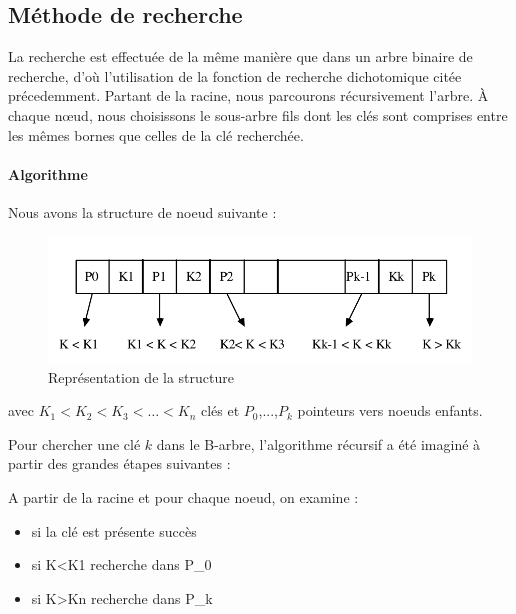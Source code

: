 \subsection{Méthode de recherche}
La recherche est effectuée de la même manière que dans un arbre binaire de recherche, d'où l'utilisation de la fonction de recherche dichotomique citée précedemment. Partant de la racine, nous parcourons récursivement l’arbre. À chaque nœud, nous choisissons le sous-arbre fils dont les clés sont comprises entre les mêmes bornes que celles de la clé recherchée.
\paragraph{Algorithme} Nous avons la structure de noeud suivante :
\begin{figure}[hbt]
	\centering
	\includegraphics[scale=0.5]{node}
	\caption{Représentation de la structure}
	\label{fig:node}
\end{figure}

avec $K_1 < K_2 < K_3 < \dots < K_n$ clés et $P_0$,...,$P_k$ pointeurs vers noeuds enfants.

Pour chercher une clé $k$ dans le B-arbre, l'algorithme récursif a été imaginé à partir des grandes étapes suivantes : 

A partir de la racine et pour chaque noeud, on examine :
\begin{itemize}
\item {si la clé est présente}    succès
\item {si K<K1} recherche dans P_0
\item {si K>Kn} recherche dans P_k
\end{itemize}

